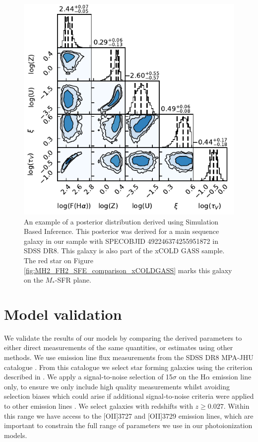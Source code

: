 \documentclass[fleqn,usenatbib]{mnras}
\begin{document}
\begin{figure}
    \centering
    \includegraphics[width=\columnwidth]{figures/fig2.pdf}
    \caption{An example of a posterior distribution derived using Simulation Based Inference. This posterior was derived for a main sequence galaxy in our sample with SPECOBJID 492246374255951872 in SDSS DR8. This galaxy is also part of the xCOLD GASS sample. The red star on Figure \ref{fig:MH2_FH2_SFE_comparison_xCOLDGASS} marks this galaxy on the $M_{*}$-SFR plane.}
    \label{fig:corner_plot_example}
\end{figure}

\section{Model validation}
\label{sec:model_validation}
We validate the results of our models by comparing the derived parameters to either direct measurements of the same quantities, or estimates using other methods. We use emission line flux measurements from the SDSS DR8 MPA-JHU catalogue \citep{brinchmann2004, kauffmann2003a, tremonti2004}. From this catalogue we select star forming galaxies using the criterion described in \cite{kauffmann2003}. We apply a signal-to-noise selection of 15$\sigma$ on the H$\alpha$ emission line only, to ensure we only include high quality measurements whilst avoiding selection biases which could arise if additional signal-to-noise criteria were applied to other emission lines \citep{yates2012, kashino2016}. We select galaxies with redshifts with $z \geq 0.027$. Within this range we have access to the [OII]3727 and [OII]3729 emission lines, which are important to constrain the full range of parameters we use in our photoionization models.
\end{document}
